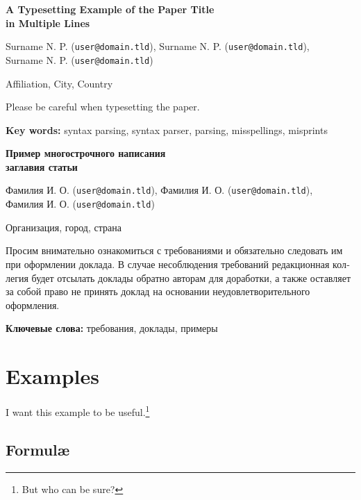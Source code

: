 \documentclass[a4paper]{article}
\date{}
\begin{document}
\begin{otherlanguage}{english}
\begin{center}
{\Large\bfseries{A Typesetting Example of the Paper Title\\in Multiple Lines}}

\medskip

Surname N. P. (\texttt{user@domain.tld}), Surname N. P. (\texttt{user@domain.tld}),\\Surname N. P. (\texttt{user@domain.tld})

\medskip

Affiliation, City, Country
\end{center}

Please be careful when typesetting the paper.\medskip

\textbf{Key words:} syntax parsing, syntax parser, parsing, misspellings, misprints
\end{otherlanguage}

\bigskip

\begin{otherlanguage}{russian}
\begin{center}
{\Large\bfseries{Пример многострочного написания\\заглавия статьи}}

\medskip

Фамилия И. О. (\texttt{user@domain.tld}), Фамилия И. О. (\texttt{user@domain.tld}),\\Фамилия И. О. (\texttt{user@domain.tld})

\medskip

Организация, город, страна
\end{center}

Просим внимательно ознакомиться с требованиями и обязательно следовать им при оформлении доклада. В случае несоблюдения требований редакционная коллегия будет отсылать доклады обратно авторам для доработки, а также оставляет за собой право не принять доклад на основании неудовлетворительного оформления.\medskip

\textbf{Ключевые слова:} требования, доклады, примеры
\end{otherlanguage}

\section{Examples}

I want this example to be useful.\footnote{But who can be sure?}

\subsection{Formul\ae}
\end{document}
